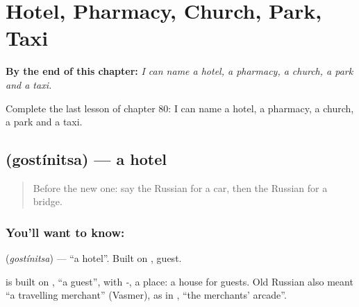 
\chapter{Hotel, Pharmacy, Church, Park, Taxi}
\label{ch:ru-hotel-pharmacy-church-park-taxi}

\begin{chapteropening}
\textbf{By the end of this chapter:} \emph{I can name a hotel, a pharmacy, a church, a park and a taxi.}

Complete the last lesson of chapter 80: I can name a hotel, a pharmacy, a church, a park and a taxi.
\end{chapteropening}

\section[\texorpdfstring{\ru{гостиница} (gostínitsa)}{гостиница (gostínitsa)}]{ (gostínitsa) — a hotel}

\label{lesson:RU-C80-hotel}



\begin{quote}
Before the new one: say the Russian for a car, then the Russian for a bridge.
\end{quote}

\subsection*{You'll want to know: }
\textbf{} (\emph{gostínitsa}) — \textquotedblleft{}a hotel\textquotedblright{}. Built on \textbf{}, guest.

\begin{cousinweb}
\textbf{} is built on \emph{}, \textquotedblleft{}a guest\textquotedblright{}, with \emph{-}, a place: a house for guests. Old Russian \emph{} also meant \textquotedblleft{}a travelling merchant\textquotedblright{} (Vasmer), as in \emph{ }, \textquotedblleft{}the merchants' arcade\textquotedblright{}.
\end{cousinweb}

